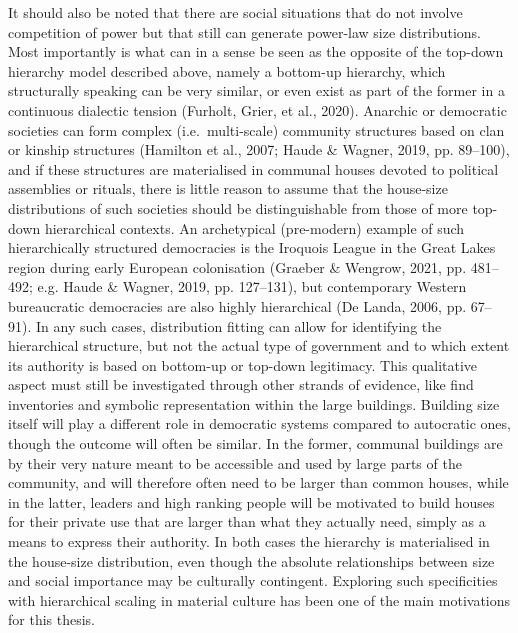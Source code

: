 \documentclass[
  12pt,
]{book}
\begin{document}
It should also be noted that there are social situations that do not involve competition of power but that still can generate power-law size distributions. Most importantly is what can in a sense be seen as the opposite of the top-down hierarchy model described above, namely a bottom-up hierarchy, which structurally speaking can be very similar, or even exist as part of the former in a continuous dialectic tension (Furholt, Grier, et al., 2020). Anarchic or democratic societies can form complex (i.e.~multi-scale) community structures based on clan or kinship structures (Hamilton et al., 2007; Haude \& Wagner, 2019, pp. 89--100), and if these structures are materialised in communal houses devoted to political assemblies or rituals, there is little reason to assume that the house-size distributions of such societies should be distinguishable from those of more top-down hierarchical contexts. An archetypical (pre-modern) example of such hierarchically structured democracies is the Iroquois League in the Great Lakes region during early European colonisation (Graeber \& Wengrow, 2021, pp. 481--492; e.g. Haude \& Wagner, 2019, pp. 127--131), but contemporary Western bureaucratic democracies are also highly hierarchical (De Landa, 2006, pp. 67--91). In any such cases, distribution fitting can allow for identifying the hierarchical structure, but not the actual type of government and to which extent its authority is based on bottom-up or top-down legitimacy. This qualitative aspect must still be investigated through other strands of evidence, like find inventories and symbolic representation within the large buildings. Building size itself will play a different role in democratic systems compared to autocratic ones, though the outcome will often be similar. In the former, communal buildings are by their very nature meant to be accessible and used by large parts of the community, and will therefore often need to be larger than common houses, while in the latter, leaders and high ranking people will be motivated to build houses for their private use that are larger than what they actually need, simply as a means to express their authority. In both cases the hierarchy is materialised in the house-size distribution, even though the absolute relationships between size and social importance may be culturally contingent. Exploring such specificities with hierarchical scaling in material culture has been one of the main motivations for this thesis.
\end{document}
